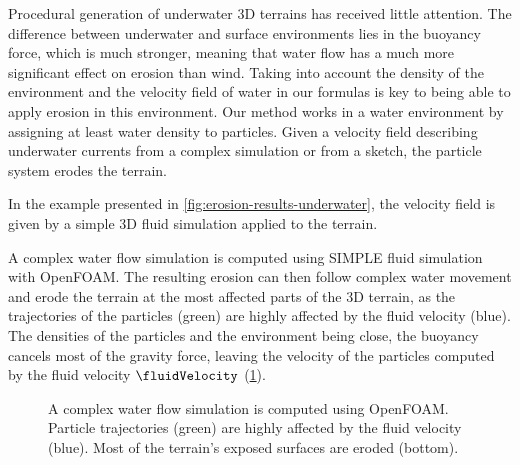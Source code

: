 Procedural generation of underwater 3D terrains has received little attention. The difference between underwater and surface environments lies in the buoyancy force, which is much stronger, meaning that water flow has a much more significant effect on erosion than wind. Taking into account the density of the environment and the velocity field of water in our formulas is key to being able to apply erosion in this environment.  
Our method works in a water environment by assigning at least water density to particles. Given a velocity field describing underwater currents from a complex simulation or from a sketch, the particle system erodes the terrain. 

In the example presented in \cref{fig:erosion-results-underwater}, the velocity field is given by a simple 3D fluid simulation \cite{Stam1999} applied to the terrain. %

A complex water flow simulation is computed using SIMPLE \cite{Caretto1973} fluid simulation with OpenFOAM. The resulting erosion can then follow complex water movement and erode the terrain at the most affected parts of the 3D terrain, as the trajectories of the particles (green) are highly affected by the fluid velocity (blue). The densities of the particles and the environment being close, the buoyancy cancels most of the gravity force, leaving the velocity of the particles computed by the fluid velocity $\fluidVelocity$ (\cref{fig:erosion-underwater_result}). %

\begin{figure}
    \caption[3D fluid simulation and particle trajectories]{A complex water flow simulation is computed using OpenFOAM. Particle trajectories (green) are highly affected by the fluid velocity (blue). Most of the terrain's exposed surfaces are eroded (bottom).}
    \label{fig:erosion-underwater_result}
\end{figure}



